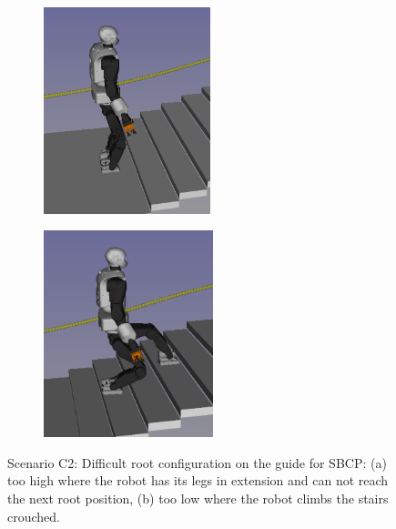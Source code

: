 \begin{figure}[h]
    \centering
    \begin{subfigure}[t]{0.42\linewidth}
        \includegraphics[width=\textwidth, height=6cm]{Figures/Chapter_CPSB/stairs_too_high_2.png}
        \caption{\label{fig:cp-sb:stairs_difficutl_high}}
    \end{subfigure}
    \begin{subfigure}[t]{0.42\linewidth}
        \includegraphics[width=\textwidth, height=6cm]{Figures/Chapter_CPSB/stairs_too_low.png}
        \caption{\label{fig:cp-sb:stairs_difficutl_low}}
    \end{subfigure}
    \caption{Scenario C2: Difficult root configuration on the guide for SBCP: (a) too high where the robot has its legs in extension and can not reach the next root position, (b) too low where the robot climbs the stairs crouched.}
    \label{fig:cp-sb:stairs_difficult}
\end{figure}
